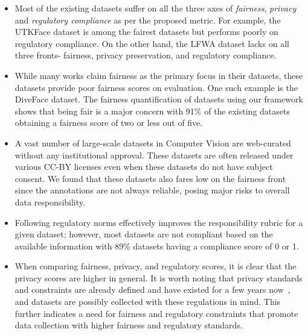 \documentclass[journal]{IEEEtran}
\begin{document}
\begin{itemize}
    \item Most of the existing datasets suffer on all the three axes of \textit{fairness}, \textit{privacy} and \textit{regulatory compliance} as per the proposed metric. For example, the UTKFace dataset is among the fairest datasets but performs poorly on regulatory compliance. On the other hand, the LFWA dataset lacks on all three fronts- fairness, privacy preservation, and regulatory compliance.
    \item While many works claim fairness as the primary focus in their datasets, these datasets provide poor fairness scores on evaluation. One such example is the DiveFace dataset. The fairness quantification of datasets using our framework shows that being fair is a major concern with 91\% of the existing datasets obtaining a fairness score of two or less out of five.
    \item A vast number of large-scale  datasets in Computer Vision are web-curated without any institutional approval. These datasets are often released under various CC-BY licenses even when these datasets do not have subject consent. We found that these datasets also fares low on the fairness front since the annotations are not always reliable, posing major risks to overall data responsibility.
    \item Following regulatory norms effectively improves the responsibility rubric for a given dataset; however, most datasets are not compliant based on the available information with 89\% datasets having a compliance score of 0 or 1.
    \item When comparing fairness, privacy, and regulatory scores, it is clear that the privacy scores are higher in general. It is worth noting that privacy standards and constraints are already defined and have  existed for a few years now~\cite{regulation2016regulation}, and datasets are possibly collected with these regulations in mind. This further indicates a need for fairness and regulatory constraints that promote data collection with higher fairness and regulatory standards.  \\
\end{itemize}

\end{document}
